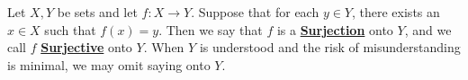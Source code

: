 \newcommand{\Surjective}[0]{\textbf{\hyperref[def:Surjective]{Surjective}}\xspace}
\newcommand{\Surjectivity}[0]{\textbf{\hyperref[def:Surjective]{Surjectivity}}\xspace}
\newcommand{\Surjection}[0]{\textbf{\hyperref[def:Surjective]{Surjection}}\xspace}
\newcommand{\Surjections}[0]{\textbf{\hyperref[def:Surjective]{Surjections}}\xspace}
\begin{df}[Surjective]
\label{def:Surjective}

\rm
   Let $X,Y$ be sets and let 
   $f:X \to Y$. 
   Suppose that 
   for each $y \in Y$, 
   there exists an 
   $x \in X$ such that 
   $f(x) = y$. 
   Then we say that $f$ 
   is a
   \Surjection onto $Y$, 
   and we call $f$ 
   \Surjective
   onto $Y$. 
   When $Y$ is understood and the risk of 
   misunderstanding is minimal, 
   we may omit saying onto $Y$.
\end{df}
